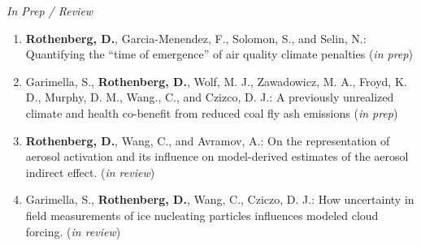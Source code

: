 \documentclass[11pt,letterpaper]{article}
\newcommand{\mhead}[1]{\leavevmode\marginpar{\sffamily\footnotesize #1}}
\begin{document}

\bigskip
\mhead{Publications}%

 \bigskip
 \emph{In Prep / Review}
 \medskip
 \begin{enumerate}[itemindent=-10pt]

 \item \textbf{Rothenberg, D.}, Garcia-Menendez, F., Solomon, S., and Selin, N.: Quantifying the ``time of emergence'' of air quality climate penalties (\emph{in prep})

 \item Garimella, S., \textbf{Rothenberg, D.}, Wolf, M. J., Zawadowicz, M. A., Froyd, K. D., Murphy, D. M., Wang., C., and Czizco, D. J.: A previously unrealized climate and health co-benefit from reduced coal fly ash emissions (\emph{in prep})

 \item \textbf{Rothenberg, D.}, Wang, C., and Avramov, A.: On the representation of aerosol activation and its influence on model-derived estimates of the aerosol indirect effect. (\emph{in review})

 \item Garimella, S., \textbf{Rothenberg, D.}, Wang, C., Cziczo, D. J.: How uncertainty in field measurements of ice nucleating particles influences modeled cloud forcing. (\emph{in review})

 \end{enumerate}
\end{document}
